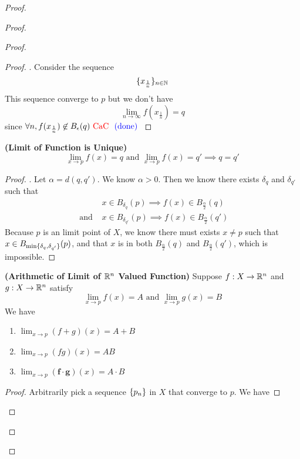 \documentclass{report}
\begin{document}
\begin{proof}
\begin{proof}
\begin{proof}
\begin{proof}
. Consider the sequence 
\begin{equation*}
\{ x_{\frac{1}{n}} \}_{n\in\mathbb{N}}
\end{equation*}
This sequence converge to $p$ but we don't have 
\begin{equation*}
\lim_{n\to\infty}f(x_{\frac{1}{n}})=q
\end{equation*}
since $\forall n, f(x_{\frac{1}{n}})\not\in B_\epsilon (q)\text{ \textcolor{red}{CaC} }\textcolor{blue}{\text{ (done) }}$ 
\end{proof}
\begin{theorem}
\label{5.1.3}
\textbf{(Limit of Function is Unique)} 
\begin{equation*}
\lim_{x\to p}f(x)=q\text{ and }\lim_{x \to p}f(x)=q'\implies q=q'
\end{equation*}
\end{theorem}
\begin{proof}
. Let $\alpha =d(q,q')$. We know $\alpha >0$. Then we know there exists $\delta_q$ and $\delta_{q'}$ such that 
\begin{align}
&x\in B_{\delta_q}(p)\implies f(x)\in B_{\frac{\alpha}{2}}(q)\\
\text{ and }&x\in B_{\delta_{q'}}(p)\implies f(x)\in B_{\frac{\alpha}{2}} (q')
\end{align}
Because $p$ is an limit point of $X$, we know there must exists $x\neq p$ such that $x\in B_{\min \{ \delta_q,\delta_{q'} \}}(p)$, and that $x$ is in both $B_{\frac{\alpha }{2}}(q)$ and $B_{\frac{\alpha}{2}}(q')$, which is impossible. \CaC
\end{proof}
\begin{theorem}
\label{5.1.4}
\textbf{(Arithmetic of Limit of $\mathbb{R}^n$ Valued Function)} Suppose  $f:X\rightarrow \mathbb{R}^n$ and $g:X\rightarrow \mathbb{R}^n$ satisfy
\begin{equation*}
\lim_{x\to p}f(x)=A\text{ and }\lim_{x\to p}g(x)=B
\end{equation*}
We have
\begin{enumerate}[label=(\alph*)]
  \item $\lim_{x\to p}(f+g)(x)=A+B$ 
  \item $\lim_{x\to p}(fg)(x)=AB$  
  \item $\lim_{x\to p}(\textbf{f}\cdot \textbf{g})(x)=A\cdot B$
\end{enumerate}
\end{theorem}
\begin{proof}
Arbitrarily pick a sequence $\{ p_n \}$ in $X$ that converge to  $p$. We have

\end{proof}
\end{proof}
\end{proof}
\end{proof}
\end{document}
